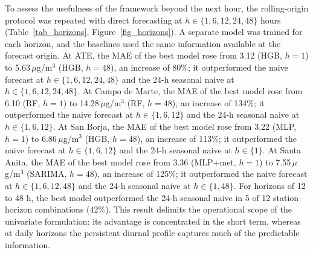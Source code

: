 To assess the usefulness of the framework beyond the next hour, the rolling-origin protocol was repeated with direct forecasting at $h \in \{1, 6, 12, 24, 48\}$ hours (Table~\ref{tab_horizons}, Figure~\ref{fig_horizons}). A separate model was trained for each horizon, and the baselines used the same information available at the forecast origin. At ATE, the MAE of the best model rose from 3.12 (HGB, $h=1$) to 5.63\,$\mu$g/m$^3$ (HGB, $h=48$), an increase of 80\%; it outperformed the naive forecast at $h \in \{1, 6, 12, 24, 48\}$ and the 24-h seasonal naive at $h \in \{1, 6, 12, 24, 48\}$. At Campo de Marte, the MAE of the best model rose from 6.10 (RF, $h=1$) to 14.28\,$\mu$g/m$^3$ (RF, $h=48$), an increase of 134\%; it outperformed the naive forecast at $h \in \{1, 6, 12\}$ and the 24-h seasonal naive at $h \in \{1, 6, 12\}$. At San Borja, the MAE of the best model rose from 3.22 (MLP, $h=1$) to 6.86\,$\mu$g/m$^3$ (HGB, $h=48$), an increase of 113\%; it outperformed the naive forecast at $h \in \{1, 6, 12\}$ and the 24-h seasonal naive at $h \in \{1\}$. At Santa Anita, the MAE of the best model rose from 3.36 (MLP+met, $h=1$) to 7.55\,$\mu$g/m$^3$ (SARIMA, $h=48$), an increase of 125\%; it outperformed the naive forecast at $h \in \{1, 6, 12, 48\}$ and the 24-h seasonal naive at $h \in \{1, 48\}$. For horizons of 12 to 48 h, the best model outperformed the 24-h seasonal naive in 5 of 12 station--horizon combinations (42\%). This result delimits the operational scope of the univariate formulation: its advantage is concentrated in the short term, whereas at daily horizons the persistent diurnal profile captures much of the predictable information.
